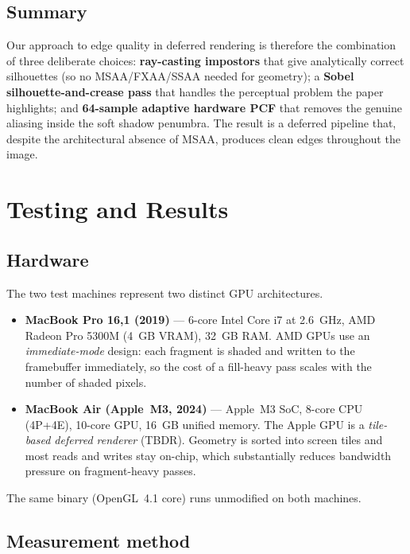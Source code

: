 \documentclass[12pt, a4paper]{article}
\begin{document}
\subsection{Summary}

Our approach to edge quality in deferred rendering is therefore the combination of three deliberate choices: \textbf{ray-casting impostors} that give analytically correct silhouettes (so no MSAA/FXAA/SSAA needed for geometry); a \textbf{Sobel silhouette-and-crease pass} that handles the perceptual problem the paper highlights; and \textbf{64-sample adaptive hardware PCF} that removes the genuine aliasing inside the soft shadow penumbra. The result is a deferred pipeline that, despite the architectural absence of MSAA, produces clean edges throughout the image.

\section{Testing and Results}

\subsection{Hardware}

The two test machines represent two distinct GPU architectures.

\begin{itemize}
    \item \textbf{MacBook Pro 16,1 (2019)} --- 6-core Intel Core i7 at 2.6~GHz, AMD Radeon Pro 5300M (4~GB VRAM), 32~GB RAM. AMD GPUs use an \emph{immediate-mode} design: each fragment is shaded and written to the framebuffer immediately, so the cost of a fill-heavy pass scales with the number of shaded pixels.
    \item \textbf{MacBook Air (Apple~M3, 2024)} --- Apple~M3 SoC, 8-core CPU (4P+4E), 10-core GPU, 16~GB unified memory. The Apple GPU is a \emph{tile-based deferred renderer} (TBDR). Geometry is sorted into screen tiles and most reads and writes stay on-chip, which substantially reduces bandwidth pressure on fragment-heavy passes.
\end{itemize}

The same binary (OpenGL~4.1 core) runs unmodified on both machines.

\subsection{Measurement method}
\end{document}

